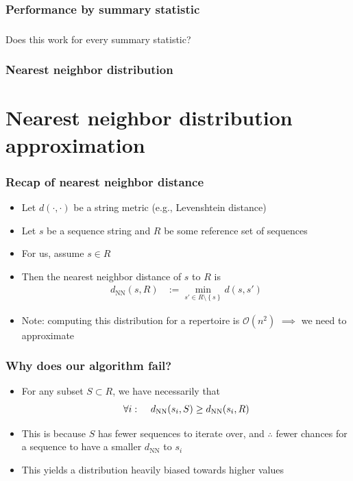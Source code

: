 \documentclass[mathserif,compress]{beamer}
\newcommand*\htab{\hspace{4 mm}}
\newcommand*\ba{\[ \begin{aligned}}
\newcommand*\ea{\end{aligned} \]}
\newcommand*\set[1]{\left\{#1\right\}}
\renewcommand\;{\,}
\begin{document}
\begin{frame}\frametitle{Performance by summary statistic}

\end{frame}

\begin{frame}\frametitle{}
\begin{center}
\huge
Does this work for every summary statistic?
\end{center}
\end{frame}

\begin{frame}\frametitle{Nearest neighbor distribution}

\end{frame}

\section{Nearest neighbor distribution approximation}

\begin{frame}\frametitle{Recap of nearest neighbor distance}
\begin{itemize}
\item[]
Let $d(\cdot, \cdot)$ be a string metric (e.g., Levenshtein distance)
\bigskip
\item[]
Let $s$ be a sequence string and $R$ be some reference set of sequences
\bigskip
\item[]
For us, assume $s \in R$
\bigskip
\item[]
Then the nearest neighbor distance of $s$ to $R$ is
\ba
d_\text{NN}(s, R)
	& := \min_{s' \in R \setminus \set{s}}
		d(s, s')
\ea
\item[]
Note: computing this distribution for a repertoire is $\mathcal O(n^2)$ $\implies$ we need to approximate
\end{itemize}
\end{frame}

\begin{frame}\frametitle{Why does our algorithm fail?}
\begin{itemize}
\item
For any subset $S \subset R$, we have necessarily that
\ba
\forall i: \htab d_\text{NN}(s_i, S) \ge d_\text{NN}(s_i, R)
\ea
\smallskip
\item
This is because $S$ has fewer sequences to iterate over, and $\therefore$ fewer chances for a sequence to have a smaller $d_\text{NN}$ to $s_i$
\bigskip
\item
This yields a distribution heavily biased towards higher values
\end{itemize}
\end{frame}
\end{document}
